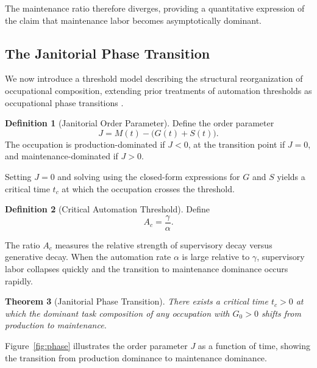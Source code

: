 \documentclass[12pt,a4paper]{article}
\theoremstyle{plain}
\newtheorem{theorem}{Theorem}[section]
\theoremstyle{definition}
\newtheorem{definition}[theorem]{Definition}
\theoremstyle{remark}
\begin{document}
The maintenance ratio therefore diverges, providing a quantitative expression
of the claim that maintenance labor becomes asymptotically dominant.

\subsection{The Janitorial Phase Transition}

We now introduce a threshold model describing the structural reorganization
of occupational composition, extending prior treatments of automation
thresholds as occupational phase transitions \cite{autor2015}.

\begin{definition}[Janitorial Order Parameter]
Define the order parameter
\[
J = M(t) - \bigl(G(t) + S(t)\bigr).
\]
The occupation is production-dominated if $J < 0$, at the transition point if
$J = 0$, and maintenance-dominated if $J > 0$.
\end{definition}

Setting $J = 0$ and solving using the closed-form expressions for $G$ and $S$
yields a critical time $t_c$ at which the occupation crosses the threshold.

\begin{definition}[Critical Automation Threshold]
Define
\[
A_c = \frac{\gamma}{\alpha}.
\]
\end{definition}

The ratio $A_c$ measures the relative strength of supervisory decay versus
generative decay.  When the automation rate $\alpha$ is large relative to
$\gamma$, supervisory labor collapses quickly and the transition to maintenance
dominance occurs rapidly.

\begin{theorem}[Janitorial Phase Transition]
\label{thm:phase}
There exists a critical time $t_c > 0$ at which the dominant task composition
of any occupation with $G_0 > 0$ shifts from production to maintenance.
\end{theorem}


Figure~\ref{fig:phase} illustrates the order parameter $J$ as a function of
time, showing the transition from production dominance to maintenance
dominance.
\end{document}
